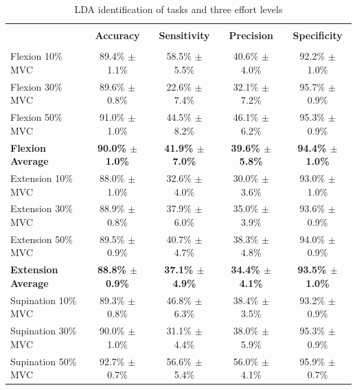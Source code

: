 \begin{table}[]
\centering
\caption{LDA identification of tasks and three effort levels}
\label{tb:2-5}
\begin{tabular}{lcccc}
 & & & &\\
                          & \textbf{Accuracy}           & \textbf{Sensitivity}        & \textbf{Precision}          & \textbf{Specificity}        \\ \hline
                          &                             &                             &                             &                             \\
Flexion 10\% MVC          & 89.4\% $\pm$ 1.1\%          & 58.5\% $\pm$ 5.5\%          & 40.6\% $\pm$ 4.0\%          & 92.2\% $\pm$ 1.0\%          \\
Flexion 30\% MVC          & 89.6\% $\pm$ 0.8\%          & 22.6\% $\pm$ 7.4\%          & 32.1\% $\pm$ 7.2\%          & 95.7\% $\pm$ 0.9\%          \\
Flexion 50\% MVC          & 91.0\% $\pm$ 1.0\%          & 44.5\% $\pm$ 8.2\%          & 46.1\% $\pm$ 6.2\%          & 95.3\% $\pm$ 0.9\%          \\
\textbf{Flexion Average}    & \textbf{90.0\% $\pm$ 1.0\%} & \textbf{41.9\% $\pm$ 7.0\%} & \textbf{39.6\% $\pm$ 5.8\%} & \textbf{94.4\% $\pm$ 1.0\%} \\
Extension 10\% MVC        & 88.0\% $\pm$ 1.0\%          & 32.6\% $\pm$ 4.0\%          & 30.0\% $\pm$ 3.6\%          & 93.0\% $\pm$ 1.0\%          \\
Extension 30\% MVC        & 88.9\% $\pm$ 0.8\%          & 37.9\% $\pm$ 6.0\%          & 35.0\% $\pm$ 3.9\%          & 93.6\% $\pm$ 0.9\%          \\
Extension 50\% MVC        & 89.5\% $\pm$ 0.9\%          & 40.7\% $\pm$ 4.7\%          & 38.3\% $\pm$ 4.8\%          & 94.0\% $\pm$ 0.9\%          \\
\textbf{Extension Average}  & \textbf{88.8\% $\pm$ 0.9\%} & \textbf{37.1\% $\pm$ 4.9\%} & \textbf{34.4\% $\pm$ 4.1\%} & \textbf{93.5\% $\pm$ 1.0\%} \\
Supination 10\% MVC       & 89.3\% $\pm$ 0.8\%          & 46.8\% $\pm$ 6.3\%          & 38.4\% $\pm$ 3.5\%          & 93.2\% $\pm$ 0.9\%          \\
Supination 30\% MVC       & 90.0\% $\pm$ 1.0\%          & 31.1\% $\pm$ 4.4\%          & 38.0\% $\pm$ 5.9\%          & 95.3\% $\pm$ 0.9\%          \\
Supination 50\% MVC       & 92.7\% $\pm$ 0.7\%          & 56.6\% $\pm$ 5.4\%          & 56.0\% $\pm$ 4.1\%          & 95.9\% $\pm$ 0.7\%          \\

\end{tabular}
\end{table}

